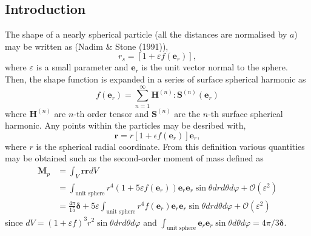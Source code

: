 \documentclass[12pt]{My_preprint}
\begin{document}
\subsection{Introduction}
The shape of a nearly spherical particle (all the distances are normalised by $a$) may be written as (Nadim \& Stone (1991)),
\begin{equation}
  r_s 
  = [1 + \varepsilon f (\textbf{e}_r)],
\end{equation}
where $\varepsilon$ is a small parameter and $\textbf{e}_r$ is the unit vector normal to the sphere.
Then, the shape function is expanded in a series of surface spherical harmonic as
\begin{equation}
f(\textbf{e}_r) = \sum_{n=1}^{\infty}\textbf{H}^{(n)}:\textbf{S}^{(n)} (\textbf{e}_r)
\end{equation}
where $\textbf{H}^{(n)}$ are $n$-th order tensor and $\textbf{S}^{(n)}$ are the $n$-th surface spherical harmonic.
Any points within the particles may be desribed with,
\begin{equation}
  \textbf{r} 
  = r[1 + \epsilon f(\textbf{e}_r)]\textbf{e}_r,
\end{equation}
where $r$ is the spherical radial coordinate.
From this definition various quantities may be obtained such as the second-order moment of mass defined as
\begin{align}
  \textbf{M}_p
  &=
  \int_{V}{\textbf{rr}}dV \\
  &=
  \int_{\text{unit sphere}}{r^4 (1+ 5\varepsilon f(\textbf{e}_r)) \textbf{e}_r \textbf{e}_r \sin\theta  dr d\theta d\varphi} + \mathcal{O}(\varepsilon^2) \\
  &= 
  \frac{4\pi}{15} \bm \delta + 5\varepsilon \int_{\text{unit sphere}}{r^4  f(\textbf{e}_r) \textbf{e}_r \textbf{e}_r \sin\theta  dr d\theta d\varphi} + \mathcal{O}(\varepsilon^2) 
\end{align}
since $dV = (1+ \varepsilon f)^3r^2\sin\theta  dr d\theta d\varphi$ and $\int_{\text{unit sphere}} \textbf{e}_r \textbf{e}_r \sin\theta  d\theta d\varphi = 4\pi/3 \bm \delta$.
\end{document}
